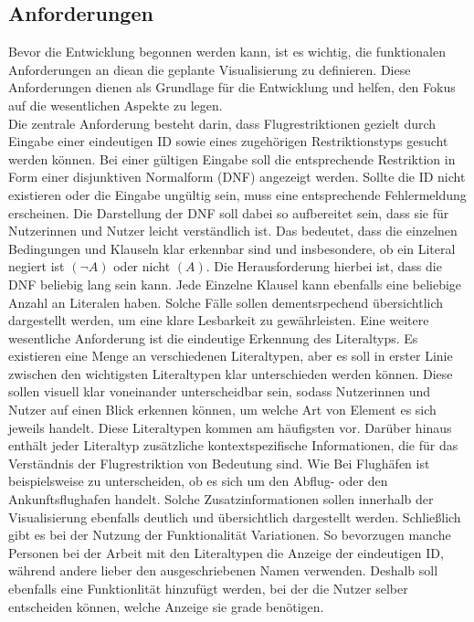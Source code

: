 \documentclass[a4paper,12pt]{article}
\begin{document}
\subsection{Anforderungen}
Bevor die Entwicklung begonnen werden kann, ist es wichtig, die funktionalen Anforderungen an diean die geplante Visualisierung zu definieren. Diese Anforderungen dienen als Grundlage für die Entwicklung und helfen, den Fokus auf die wesentlichen Aspekte zu legen.\\
Die zentrale Anforderung besteht darin, dass Flugrestriktionen gezielt durch Eingabe einer eindeutigen ID sowie eines zugehörigen Restriktionstyps gesucht werden können. Bei einer gültigen Eingabe soll die entsprechende Restriktion in Form einer disjunktiven Normalform (DNF) angezeigt werden. Sollte die ID nicht existieren oder die Eingabe ungültig sein, muss eine entsprechende Fehlermeldung erscheinen. Die Darstellung der DNF soll dabei so aufbereitet sein, dass sie für Nutzerinnen und Nutzer leicht verständlich ist. Das bedeutet, dass die einzelnen Bedingungen und Klauseln klar erkennbar sind und insbesondere, ob ein Literal negiert ist \(( \neg A )\) oder nicht \(( A )\). Die Herausforderung hierbei ist, dass die DNF beliebig lang sein kann. Jede Einzelne Klausel kann ebenfalls eine beliebige Anzahl an Literalen haben. Solche Fälle sollen dementsrpechend übersichtlich dargestellt werden, um eine klare Lesbarkeit zu gewährleisten.
Eine weitere wesentliche Anforderung ist die eindeutige Erkennung des Literaltyps. Es existieren eine Menge an verschiedenen Literaltypen, aber es soll in erster Linie zwischen den wichtigsten Literaltypen klar unterschieden werden können. Diese sollen visuell klar voneinander unterscheidbar sein, sodass Nutzerinnen und Nutzer auf einen Blick erkennen können, um welche Art von Element es sich jeweils handelt. Diese Literaltypen kommen am häufigsten vor. Darüber hinaus enthält jeder Literaltyp zusätzliche kontextspezifische Informationen, die für das Verständnis der Flugrestriktion von Bedeutung sind. Wie Bei Flughäfen ist beispielsweise zu unterscheiden, ob es sich um den Abflug- oder den Ankunftsflughafen handelt. Solche Zusatzinformationen sollen innerhalb der Visualisierung ebenfalls deutlich und übersichtlich dargestellt werden. Schließlich gibt es bei der Nutzung der Funktionalität Variationen. So bevorzugen manche Personen bei der Arbeit mit den Literaltypen die Anzeige der eindeutigen ID, während andere lieber den ausgeschriebenen Namen verwenden. Deshalb soll ebenfalls eine Funktionlität hinzufügt werden, bei der die Nutzer selber entscheiden können, welche Anzeige sie grade benötigen. \\
\end{document}
